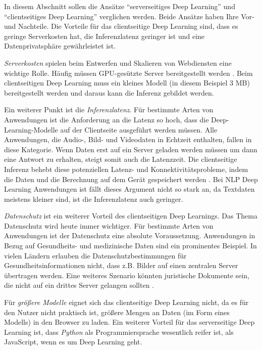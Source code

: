 In diesem Abschnitt sollen die Ansätze \enquote{serverseitiges Deep Learning} und \enquote{clientseitiges Deep Learning} verglichen werden. Beide Ansätze haben Ihre Vor- und Nachteile. Die Vorteile für das clientseitige Deep Learning sind, dass es geringe Serverkosten hat, die Inferenzlatenz geringer ist und eine Datenprivatsphäre gewährleistet ist. 

\textit{Serverkosten} spielen beim Entwerfen und Skalieren von Webdiensten eine wichtige Rolle. Häufig müssen GPU-gesützte Server bereitgestellt werden  \cite[19]{cai2020deep}. Beim clientseitigen Deep Learning muss ein kleines Modell (in diesem Beispiel 3 MB) bereitgestellt werden und daraus kann die Inferenz gebildet werden.

Ein weiterer Punkt ist die \textit{Inferenzlatenz}. Für bestimmte Arten von Anwendungen ist die Anforderung an die Latenz so hoch, dass die Deep-Learning-Modelle auf der Clientseite ausgeführt werden müssen. Alle Anwendungen, die Audio-, Bild- und Videodaten in Echtzeit enthalten, fallen in diese Kategorie. Wenn Daten erst auf ein Server geladen werden müssen um dann eine Antwort zu erhalten, steigt somit auch die Latenzzeit. Die clientseitige Inferenz behebt diese potenziellen Latenz- und Konnektivitätsprobleme, indem die Daten und die Berechnung auf dem Gerät gespeichert werden \cite[20]{cai2020deep}. Bei NLP Deep Learning Anwendungen ist fällt dieses Argument nicht so stark an, da Textdaten meistens kleiner sind, ist die Inferenzlatenz auch geringer.

\textit{Datenschutz} ist ein weiterer Vorteil des clientseitigen Deep Learnings. Das Thema Datenschutz wird heute immer wichtiger. Für bestimmte Arten von Anwendungen ist der Datenschutz eine absolute Voraussetzung. Anwendungen in Bezug auf Gesundheits- und medizinische Daten sind ein prominentes Beispiel. In vielen Ländern erlauben die Datenschutzbestimmungen für Gesundheitsinformationen nicht, dass z.B. Bilder auf einen zentralen Server übertragen werden. Eine weiteres Szenario könnten juristische Dokumente sein, die nicht auf ein drittes Server gelangen sollten \cite[20]{cai2020deep}. 

Für \textit{größere Modelle} eignet sich das clientseitige Deep Learning nicht, da es für den Nutzer nicht praktisch ist, größere Mengen an Daten (im Form eines Modells) in den Browser zu laden. Ein weiterer Vorteil für das serverseitige Deep Learning ist, dass \textit{Python} als Programmiersprache wesentlich reifer ist, als JavaScript, wenn es um Deep Learning geht. 